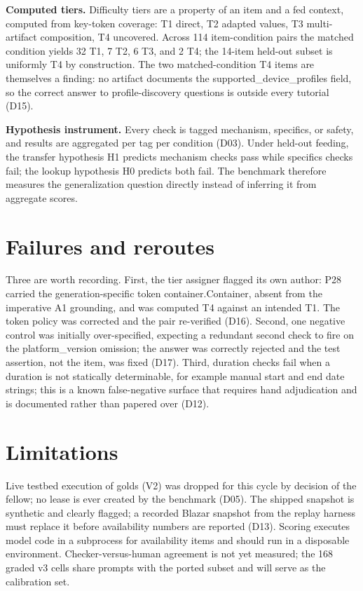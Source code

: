 \documentclass[conference]{IEEEtran}
\begin{document}
\textbf{Computed tiers.} Difficulty tiers are a property of an item and a fed
context, computed from key-token coverage: T1 direct, T2 adapted values, T3
multi-artifact composition, T4 uncovered. Across 114 item-condition pairs the
matched condition yields 32 T1, 7 T2, 6 T3, and 2 T4; the 14-item held-out
subset is uniformly T4 by construction. The two matched-condition T4 items are
themselves a finding: no artifact documents the supported\_device\_profiles
field, so the correct answer to profile-discovery questions is outside every
tutorial (D15).

\textbf{Hypothesis instrument.} Every check is tagged mechanism, specifics, or
safety, and results are aggregated per tag per condition (D03). Under held-out
feeding, the transfer hypothesis H1 predicts mechanism checks pass while
specifics checks fail; the lookup hypothesis H0 predicts both fail. The
benchmark therefore measures the generalization question directly instead of
inferring it from aggregate scores.

\section{Failures and reroutes}
Three are worth recording. First, the tier assigner flagged its own author:
P28 carried the generation-specific token container.Container, absent from the
imperative A1 grounding, and was computed T4 against an intended T1. The token
policy was corrected and the pair re-verified (D16). Second, one negative
control was initially over-specified, expecting a redundant second check to
fire on the platform\_version omission; the answer was correctly rejected and
the test assertion, not the item, was fixed (D17). Third, duration checks fail
when a duration is not statically determinable, for example manual start and
end date strings; this is a known false-negative surface that requires hand
adjudication and is documented rather than papered over (D12).

\section{Limitations}
Live testbed execution of golds (V2) was dropped for this cycle by decision of
the fellow; no lease is ever created by the benchmark (D05). The shipped
snapshot is synthetic and clearly flagged; a recorded Blazar snapshot from the
replay harness must replace it before availability numbers are reported (D13).
Scoring executes model code in a subprocess for availability items and should
run in a disposable environment. Checker-versus-human agreement is not yet
measured; the 168 graded v3 cells share prompts with the ported subset and
will serve as the calibration set.
\end{document}
